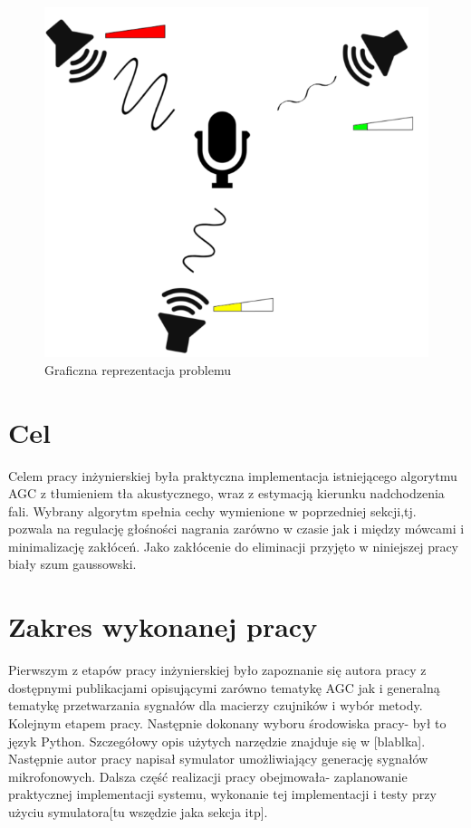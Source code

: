 \begin{figure}[h]
    \centering
    \includegraphics[width=\textwidth]{Images/setup.png}
    \caption{Graficzna reprezentacja problemu}
    \label{fig:setup}
\end{figure}

\section{Cel}
Celem pracy inżynierskiej była praktyczna implementacja istniejącego algorytmu AGC z tłumieniem tła akustycznego, wraz z estymacją kierunku nadchodzenia fali. Wybrany algorytm spełnia cechy wymienione w poprzedniej sekcji,tj. pozwala na regulację głośności nagrania zarówno w czasie jak i między mówcami i minimalizację zakłóceń. Jako zakłócenie do eliminacji przyjęto w niniejszej pracy biały szum gaussowski.

\section{Zakres wykonanej pracy}
Pierwszym z etapów pracy inżynierskiej było zapoznanie się autora pracy z dostępnymi publikacjami opisującymi zarówno tematykę AGC jak i generalną tematykę przetwarzania sygnałów dla macierzy czujników i wybór metody. 
Kolejnym etapem pracy. Następnie dokonany wyboru środowiska pracy- był to język Python. Szczegółowy opis użytych narzędzie znajduje się w [blablka]. Następnie autor pracy napisał symulator umożliwiający generację sygnałów mikrofonowych. Dalsza część realizacji pracy obejmowała- zaplanowanie praktycznej implementacji systemu, wykonanie tej implementacji i testy przy użyciu symulatora[tu wszędzie jaka sekcja itp].

